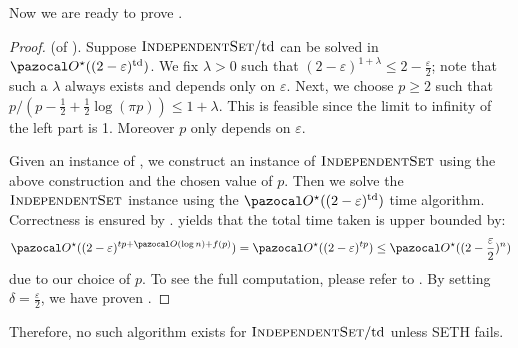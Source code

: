 

Now we are ready to prove .

\begin{proof}
    (of ). Suppose $\textsc{IndependentSet}/\text{td}$ can be solved in $\O^\star((2-\varepsilon)^\td)$. We fix $\lambda > 0$ such that $(2 - \varepsilon)^{1 + \lambda} \leq 2 - \frac{\varepsilon}{2}$; note that such a $\lambda$ always exists and depends only on $\varepsilon$. Next, we choose $p \geq 2$ such that $p/(p - \frac{1}{2} + \frac{1}{2}\log(\pi p)) \leq 1 + \lambda$. This is feasible since the limit to infinity of the left part is 1. Moreover $p$ only depends on $\varepsilon$. 
    
    Given an instance of , we construct an instance of $\textsc{IndependentSet}$ using the above construction and the chosen value of $p$. Then we solve the $\textsc{IndependentSet}$ instance using the $\O^\star((2 - \varepsilon)^\td)$ time algorithm. Correctness is ensured by .  yields that the total time taken is upper bounded by: $$\O^\star((2-\varepsilon)^{tp + \O(\log n) + f(p)}) = \O^\star((2-\varepsilon)^{tp}) \leq \O^\star((2-\frac{\varepsilon}{2})^{n})$$ due to our choice of $p$. To see the full computation, please refer to . By setting $\delta = \frac{\varepsilon}{2}$, we have proven .
\end{proof}

Therefore, no such algorithm exists for $\textsc{IndependentSet}/\text{td}$ unless SETH fails.